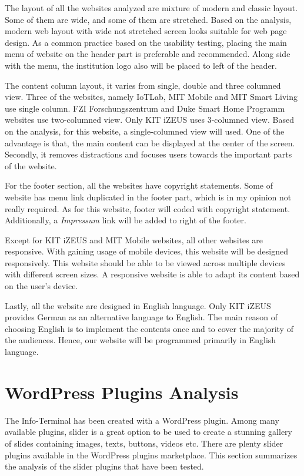 The layout of all the websites analyzed are mixture of modern and classic layout. Some of them are wide, and some of them are stretched. Based on the analysis, modern web layout with wide not stretched screen looks suitable for web page design. As a common practice based on the usability testing, placing the main menu of website on the header part is preferable and recommended. Along side with the menu, the institution logo also will be placed to left of the header.

The content column layout, it varies from single, double and three columned view. Three of the websites, namely IoTLab, MIT Mobile and MIT Smart Living use single column. FZI Forschungszentrum and Duke Smart Home Programm websites use two-columned view. Only KIT iZEUS uses 3-columned view. Based on the analysis, for this website, a single-columned view will used. One of the advantage is that, the main content can be displayed at the center of the screen. Secondly, it removes distractions and focuses users towards the important parts of the website.

For the footer section, all the websites have copyright statements. Some of website has menu link duplicated in the footer part, which is in my opinion not really required. As for this website, footer will coded with copyright statement. Additionally, a \emph{Impressum} link will be added to right of the footer.

Except for KIT iZEUS and MIT Mobile websites, all other websites are responsive. With gaining usage of mobile devices, this website will be designed responsively. This website should be able to be viewed across multiple devices with different screen sizes. A responsive website is able to adapt its content based on the user's device.

Lastly, all the website are designed in English language. Only KIT iZEUS provides German as an alternative language to English. The main reason of choosing English is to implement the contents once and to cover the majority of the audiences. Hence, our website will be programmed primarily in English language.

\section{WordPress Plugins Analysis}
The Info-Terminal has been created with a WordPress plugin. Among many available plugins, slider \cite{SyedBalkhi.2015} is a great option to be used to create a stunning gallery of slides containing images, texts, buttons, videos etc. There are plenty slider plugins available in the WordPress plugins marketplace. This section summarizes the analysis of the slider plugins that have been tested.

